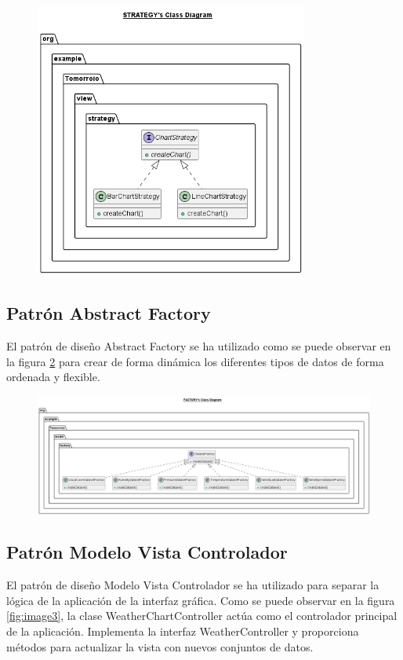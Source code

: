 \documentclass{article}
\begin{document}
\begin{figure}[H]
  \centering
  \includegraphics[width=0.8\textwidth]{images/image2.png}
  \label{fig:image2}
\end{figure}

\subsection{Patrón Abstract Factory}
El patrón de diseño Abstract Factory se ha utilizado como se puede observar en la figura \ref{fig:image7} para crear de forma dinámica los diferentes tipos de datos de forma ordenada y flexible.

\begin{figure}[H]
  \centering
  \includegraphics[width=1.1\textwidth]{images/image7.png}
  \label{fig:image7}
\end{figure}

\subsection{Patrón Modelo Vista Controlador}
El patrón de diseño Modelo Vista Controlador se ha utilizado para separar la lógica de la aplicación de la interfaz gráfica. Como se puede observar en la figura \ref{fig:image3}, la clase WeatherChartController actúa como el controlador principal de la aplicación. Implementa la interfaz WeatherController y proporciona métodos para actualizar la vista con nuevos conjuntos de datos.
\end{document}
